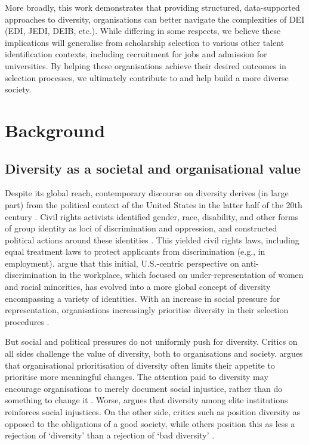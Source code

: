 \noindent More broadly, this work demonstrates that providing structured, data-supported approaches to diversity, organisations can better navigate the complexities of DEI (EDI, JEDI, DEIB, etc.). While differing in some respects, we believe these implications will generalise from scholarship selection to various other talent identification contexts, including recruitment for jobs and admission for universities. By helping these organisations achieve their desired outcomes in selection processes, we ultimately contribute to and help build a more diverse society.

\section{Background}\label{sec:back}
\subsection{Diversity as a societal and organisational value}\label{ssec:value}
Despite its global reach, contemporary discourse on diversity derives (in large part) from the political context of the United States in the latter half of the 20th century \cite{nkomo2019diversity}. Civil rights activists identified gender, race, disability, and other forms of group identity as loci of discrimination and oppression, and constructed political actions around these identities \cite{morris1984origins}. This yielded civil rights laws, including equal treatment laws to protect applicants from discrimination (e.g., in employment). \textcite{nkomo2019diversity} argue that this initial, U.S.-centric perspective on anti-discrimination in the workplace, which focused on under-representation of women and racial minorities, has evolved into a more global concept of diversity encompassing a variety of identities. With an increase in social pressure for representation, organisations increasingly prioritise diversity in their selection procedures \cite{hsieh2019allocation,minkin2023diversity}.

But social and political pressures do not uniformly push for diversity. Critics on all sides challenge the value of diversity, both to organisations and society. \textcite{Ahmed_2012} argues that organisational prioritisation of diversity often limits their appetite to prioritise more meaningful changes. The attention paid to diversity may encourage organisations to merely document social injustice, rather than do something to change it \cite{Ahmed_2012,Rossi2020-ROSWNA-2}. Worse, \textcite{Warikoo_2019} argues that diversity among elite institutions reinforces social injustices. On the other side, critics such as \textcite{Goodhart} position diversity as opposed to the obligations of a good society, while others position this as less a rejection of `diversity' than a rejection of `bad diversity' \cite{lentin_Multiculturalism_2011}.

